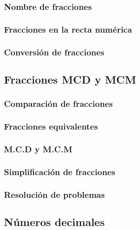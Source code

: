 \documentclass[12pt,repaso,answers]{RDS_unit}
\begin{document}
\begin{questions}
	\subsubsection{Nombre de fracciones}
	\question[1]{}
	\subsubsection{Fracciones en la recta numérica}
	\question[1]{}
	\subsubsection{Conversión de fracciones}
	\question[1]{}

	\subsection   {Fracciones MCD y MCM}
	\subsubsection{Comparación de fracciones}
	\question[1]{}
	\subsubsection{Fracciones equivalentes}
	\question[1]{}
	\subsubsection{M.C.D y M.C.M}
	\question[1]{}
	\subsubsection{Simplificación de fracciones}
	\question[1]{}
	\subsubsection{Resolución de problemas}
	\question[1]{}

	\subsection   {Números decimales}

\end{questions}
\end{document}
